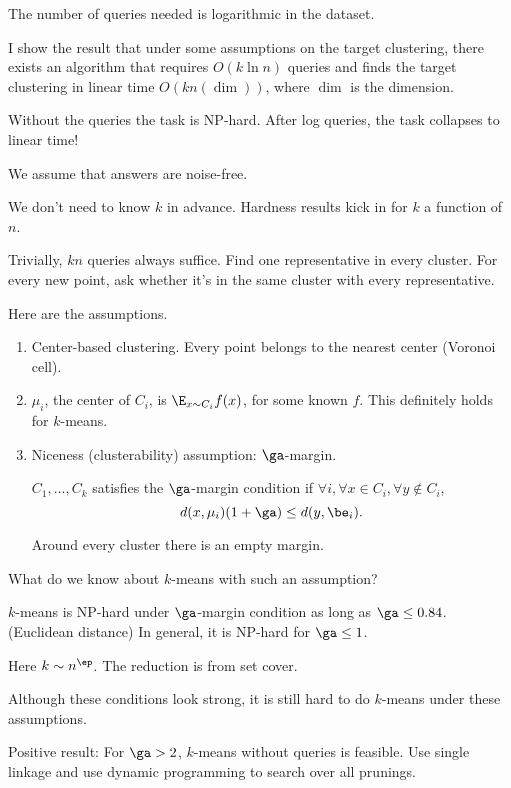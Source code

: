 The number of queries needed is logarithmic in the dataset.

I show the result that under some assumptions on the target clustering, there exists an algorithm that requires $O(k\ln n)$ queries and finds the target clustering in linear time $O(kn(\dim))$, where $\dim$ is the dimension.

Without the queries the task is NP-hard. After log queries, the task collapses to linear time!

We assume that answers are noise-free.

We don't need to know $k$ in advance.
Hardness results kick in for $k$ a function of $n$.

Trivially, $kn$ queries always suffice. Find one representative in every cluster. For every new point, ask whether it's in the same cluster with every representative.

Here are the assumptions.
\begin{enumerate}
\item
Center-based clustering. Every point belongs to the nearest center (Voronoi cell).
\item
$\mu_i$, the center of $C_i$, is $\E_{x\sim C_i} f(x)$, for some known $f$. This definitely holds for $k$-means.
\item
Niceness (clusterability) assumption: $\ga$-margin.

\begin{df}
$C_1,\ldots, C_k$ satisfies the $\ga$-margin condition if 
$\forall i, \forall x\in C_i, \forall y\nin C_i$, 
$$
d(x,\mu_i)(1+\ga) \le d(y,\be_i).
$$
\end{df}
Around every cluster there is an empty margin.
\end{enumerate}
What do we know about $k$-means with such an assumption? 

\begin{thm}
$k$-means is NP-hard under $\ga$-margin condition as long as $\ga \le 0.84$. (Euclidean distance)
In general, it is NP-hard for $\ga \le 1$. 
\end{thm}
Here $k\sim n^\ep$. The reduction is from set cover.  %

Although these conditions look strong, it is still hard to do $k$-means under these assumptions.

Positive result: For $\ga>2$, $k$-means without queries is feasible. Use single linkage and use dynamic programming to search over all prunings. %

